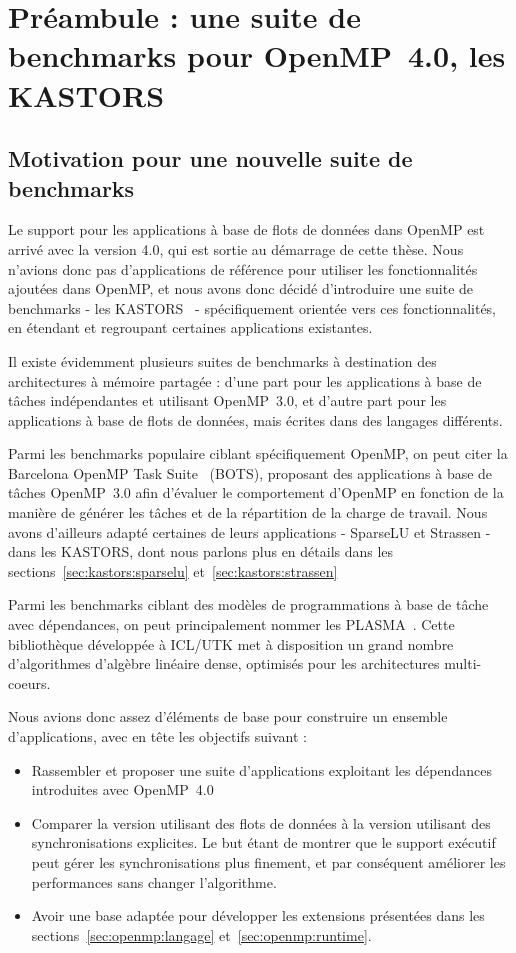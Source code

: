 \section{Préambule : une suite de benchmarks pour OpenMP~4.0, les KASTORS}

\subsection{Motivation pour une nouvelle suite de benchmarks}

Le support pour les applications à base de flots de données dans OpenMP est arrivé avec la version 4.0, qui est sortie au démarrage de cette thèse.
Nous n'avions donc pas d'applications de référence pour utiliser les fonctionnalités ajoutées dans OpenMP, et nous avons donc décidé d'introduire une suite de benchmarks - les KASTORS~\cite{Virouleau2014} - spécifiquement orientée vers ces fonctionnalités, en étendant et regroupant certaines applications existantes.

Il existe évidemment plusieurs suites de benchmarks à destination des architectures à mémoire partagée : d'une part pour les applications à base de tâches indépendantes et utilisant OpenMP~3.0, et d'autre part pour les applications à base de flots de données, mais écrites dans des langages différents.

Parmi les benchmarks populaire ciblant spécifiquement OpenMP, on peut citer la Barcelona OpenMP Task Suite~\cite{Duran2009} (BOTS), proposant des applications à base de tâches OpenMP~3.0 afin d'évaluer le comportement d'OpenMP en fonction de la manière de générer les tâches et de la répartition de la charge de travail.
Nous avons d'ailleurs adapté certaines de leurs applications - SparseLU et Strassen - dans les KASTORS, dont nous parlons plus en détails dans les sections~\ref{sec:kastors:sparselu} et~\ref{sec:kastors:strassen}

Parmi les benchmarks ciblant des modèles de programmations à base de tâche avec dépendances, on peut principalement nommer les PLASMA~\cite{Kurzak2013}.
Cette bibliothèque développée à ICL/UTK met à disposition un grand nombre d'algorithmes d'algèbre linéaire dense, optimisés pour les architectures multi-coeurs.

Nous avions donc assez d'éléments de base pour construire un ensemble d'applications, avec en tête les objectifs suivant :
\begin{itemize}
  \item Rassembler et proposer une suite d'applications exploitant les dépendances introduites avec OpenMP~4.0
  \item Comparer la version utilisant des flots de données à la version utilisant des synchronisations explicites. Le but étant de montrer que le support exécutif peut gérer les synchronisations plus finement, et par conséquent améliorer les performances sans changer l'algorithme.
  \item Avoir une base adaptée pour développer les extensions présentées dans les sections~\ref{sec:openmp:langage} et~\ref{sec:openmp:runtime}.
\end{itemize}

